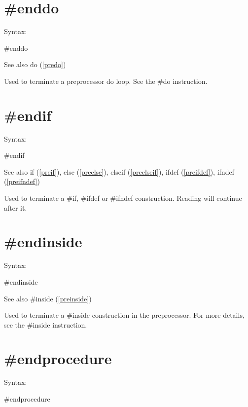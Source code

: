 \section{\#enddo}
\label{preenddo}

\noindent Syntax:

\#enddo
 
\noindent See also do (\ref{predo})

\noindent Used to terminate a preprocessor 
do loop. See the \#do instruction.


\section{\#endif}
\label{preendif}

\noindent Syntax:

\#endif
 
\noindent See also if (\ref{preif}),
            else (\ref{preelse}),
            elseif (\ref{preelseif}),
            ifdef (\ref{preifdef}),
            ifndef (\ref{preifndef})

\noindent Used to terminate a \#if, 
\#ifdef or \#ifndef construction. 
Reading will continue after it.


\section{\#endinside}
\label{preendinside}

\noindent Syntax:

\#endinside
 
\noindent See also \#inside (\ref{preinside})

\noindent Used to terminate a \#inside construction in 
the preprocessor. For more details, see the \#inside 
instruction.


\section{\#endprocedure}
\label{preendprocedure}

\noindent Syntax:

\#endprocedure
 
